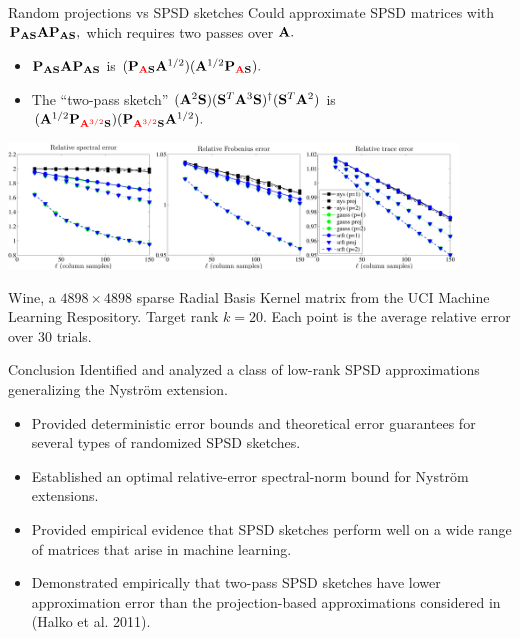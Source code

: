 \documentclass[xcolor=x11names,compress,ignorenonframetext,10pt]{beamer}
\renewcommand{\(}{\begin{columns}}
\renewcommand{\)}{\end{columns}}
\newcommand{\<}[1]{\begin{column}{#1}}
\renewcommand{\>}{\end{column}}
\def\refcolor{DodgerBlue4}
\newcommand{\refer}[1]{({\color{\refcolor}#1})}
\begin{document}
\begin{frame}{Random projections vs SPSD sketches}
Could approximate SPSD matrices with $\mathbf{P}_{\mathbf{A} \mathbf{S}} \mathbf{A} \mathbf{P}_{\mathbf{A} \mathbf{S}},$ which requires two passes over $\mathbf{A}.$ 
\begin{itemize} 
 \item $\mathbf{P}_{\mathbf{A}\mathbf{S}} \mathbf{A} \mathbf{P}_{\mathbf{A} \mathbf{S}}$ is $(\mathbf{P}_{{\color{red} \mathbf{A}}\mathbf{S}} \mathbf{A}^{1/2})(\mathbf{A}^{1/2} \mathbf{P}_{{\color{red} \mathbf{A}} \mathbf{S}}).$
 \item The ``two-pass sketch'' $(\mathbf{A}^2 \mathbf{S}) (\mathbf{S}^T \mathbf{A}^3 \mathbf{S})^\dagger (\mathbf{S}^T\mathbf{A}^2)$ is 
 $(\mathbf{A}^{1/2} \mathbf{P}_{{\color{red} \mathbf{A}^{3/2}} \mathbf{S}})(\mathbf{P}_{{\color{red} \mathbf{A}^{3/2}}\mathbf{S}} \mathbf{A}^{1/2} ).$
\end{itemize}

\centerline{\includegraphics[width=4.7in, keepaspectratio=true]{figures/spsd/Winecompactsigma1-eigexact-methods-nonfixed-rank-errors-with-eig}}

Wine, a $4898\times4898$ sparse Radial Basis Kernel matrix from the UCI Machine Learning Respository. Target rank $k=20.$ Each
point is the average relative error over 30 trials.
\end{frame}

 \begin{frame}{Conclusion}
  Identified and analyzed a class of low-rank SPSD approximations generalizing the Nystr\"om extension.
   \begin{itemize}
        \item Provided deterministic error bounds and theoretical error guarantees for several types of randomized
     SPSD sketches.
     \item Established an optimal relative-error spectral-norm bound for Nystr\"om extensions.
     \item Provided empirical evidence that SPSD sketches perform well on a wide range of matrices
     that arise in machine learning.
     \item Demonstrated empirically that two-pass SPSD sketches have lower approximation error than the projection-based approximations
     considered in \refer{Halko et al. 2011}.
    \end{itemize}

 \end{frame}
\end{document}

